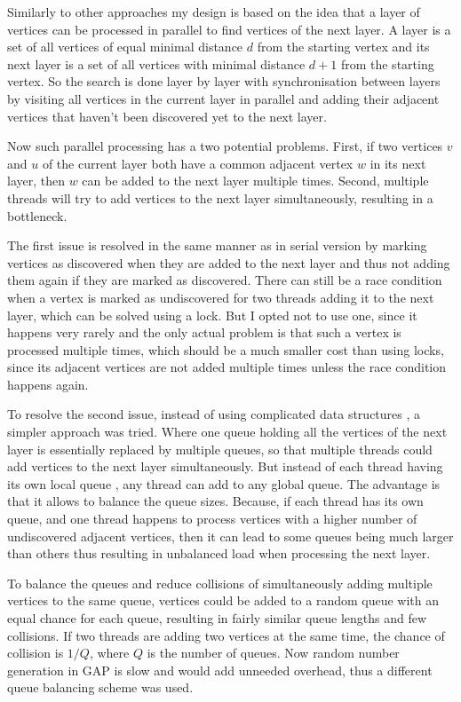 \documentclass{report}
\theoremstyle{plain}
\theoremstyle{definition}
\theoremstyle{remark}
\begin{document}
Similarly to other approaches my design is based on the idea that a layer of vertices can be processed in parallel to find vertices of the next layer. A layer is a set of all vertices of equal minimal distance $d$ from the starting vertex and its next layer is a set of all vertices with minimal distance $d + 1$ from the starting vertex. So the search is done layer by layer with synchronisation between layers by visiting all vertices in the current layer in parallel and adding their adjacent vertices that haven't been discovered yet to the next layer.

Now such parallel processing has a two potential problems. First, if two vertices $v$ and $u$ of the current layer both have a common adjacent vertex $w$ in its next layer, then $w$ can be added to the next layer multiple times. Second, multiple threads will try to add vertices to the next layer simultaneously, resulting in a bottleneck.

The first issue is resolved in  the same manner as in serial version by marking vertices as discovered when they are added to the next layer and thus not adding them again if they are marked as discovered. There can still be a race condition when a vertex is marked as undiscovered for two threads adding it to the next layer, which can be solved using a lock. But I opted not to use one, since it happens very rarely and the only actual problem is that such a vertex is processed multiple times, which should be a much smaller cost than using locks, since its adjacent vertices are not added multiple times unless the race condition happens again.

To resolve the second issue, instead of using complicated data structures \cite{Leiserson}, a simpler approach was tried. Where one queue holding all the vertices of the next layer is essentially replaced by multiple queues, so that multiple threads could add vertices to the next layer simultaneously. But instead of each thread having its own local queue \cite{cong2008solving, zhang2006parallel}, any thread can add to any global queue. The advantage is that it allows to balance the queue sizes. Because, if each thread has its own queue, and one thread happens to process vertices with a higher number of undiscovered adjacent vertices, then it can lead to some queues being much larger than others thus resulting in unbalanced load when processing the next layer.

To balance the queues and reduce collisions of simultaneously adding multiple vertices to the same queue, vertices could be added to a random queue with an equal chance for each queue, resulting in fairly similar queue lengths and few collisions. If two threads are adding two vertices at the same time, the chance of collision is $1/Q$, where $Q$ is the number of queues. Now random number generation in GAP is slow and would add unneeded overhead, thus a different queue balancing scheme was used.
\end{document}

